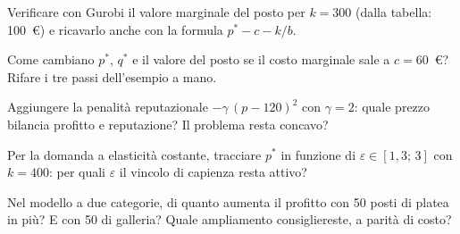 \begin{esercizio}[verifica]
Verificare con Gurobi il valore marginale del posto per $k = 300$ (dalla tabella:
100~\euro) e ricavarlo anche con la formula $p^* - c - k/b$.
\end{esercizio}

\begin{esercizio}
Come cambiano $p^*$, $q^*$ e il valore del posto se il costo marginale sale a
$c = 60$~\euro? Rifare i tre passi dell'esempio a mano.
\end{esercizio}

\begin{esercizio}
Aggiungere la penalità reputazionale $-\gamma\,(p - 120)^2$ con $\gamma = 2$:
quale prezzo bilancia profitto e reputazione? Il problema resta concavo?
\end{esercizio}

\begin{esercizio}[elasticità]
Per la domanda a elasticità costante, tracciare $p^*$ in funzione di
$\varepsilon \in [1{,}3;\, 3]$ con $k = 400$: per quali $\varepsilon$ il vincolo di
capienza resta attivo?
\end{esercizio}

\begin{esercizio}[multiprodotto]
Nel modello a due categorie, di quanto aumenta il profitto con 50 posti di platea in
più? E con 50 di galleria? Quale ampliamento consigliereste, a parità di costo?
\end{esercizio}
